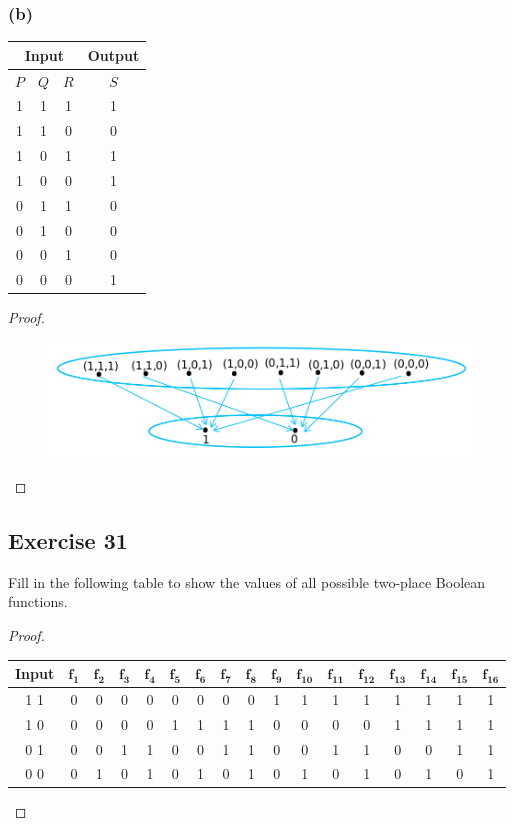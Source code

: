 \documentclass[14pt]{extarticle}
\newcommand{\cy}{\color{cyan}}
\begin{document}
\subsubsection{(b)}
\begin{center}
\begin{tabular}{|ccc|c|}
\hline
\multicolumn{3}{|c|}{\cy Input} & {\cy Output} \\
\hline
$P$ & $Q$ & $R$ & $S$ \\
\hline
1 & 1 & 1 & 1 \\
\hline
1 & 1 & 0 & 0 \\
\hline
1 & 0 & 1 & 1 \\
\hline
1 & 0 & 0 & 1 \\
\hline
0 & 1 & 1 & 0 \\
\hline
0 & 1 & 0 & 0 \\
\hline
0 & 0 & 1 & 0 \\
\hline
0 & 0 & 0 & 1 \\
\hline
\end{tabular}
\end{center}

\begin{proof}
\begin{figure}[ht!]
\centering
\includegraphics[scale=0.4]{../images/7.1.30.b.png}
\end{figure}
\end{proof}

\subsection{Exercise 31}
Fill in the following table to show the values of all possible two-place Boolean functions.

\begin{proof}
\begin{center}
\begin{tabular}{|c|c|c|c|c|c|c|c|c|c|c|c|c|c|c|c|c|}
\hline
{\bf Input} & \(\bm{f_{1}}\) & \(\bm{f_{2}}\) & 
\(\bm{f_{3}}\) & \(\bm{f_{4}}\) & \(\bm{f_{5}}\) & 
\(\bm{f_{6}}\) & \(\bm{f_{7}}\) & \(\bm{f_{8}}\) & 
\(\bm{f_{9}}\) & \(\bm{f_{10}}\) & \(\bm{f_{11}}\) & 
\(\bm{f_{12}}\) & \(\bm{f_{13}}\) & \(\bm{f_{14}}\) & 
\(\bm{f_{15}}\) & \(\bm{f_{16}}\) \\
\hline
1 1 &0&0&0&0&0&0&0&0&1&1&1&1&1&1&1&1 \\
\hline
1 0 &0&0&0&0&1&1&1&1&0&0&0&0&1&1&1&1 \\
\hline
0 1 &0&0&1&1&0&0&1&1&0&0&1&1&0&0&1&1 \\
\hline
0 0 &0&1&0&1&0&1&0&1&0&1&0&1&0&1&0&1 \\
\hline
\end{tabular}
\end{center}
\end{proof}
\end{document}
